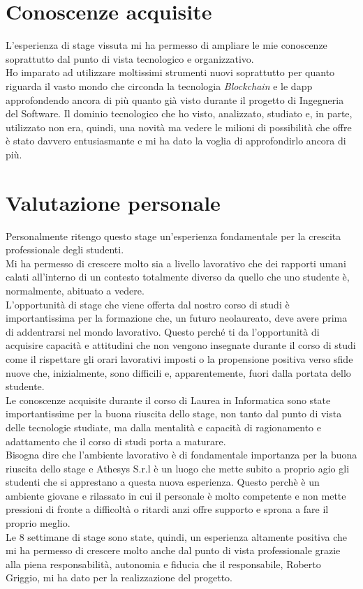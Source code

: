 \section{Conoscenze acquisite}
L'esperienza di stage vissuta mi ha permesso di ampliare le mie conoscenze soprattutto dal punto di vista tecnologico e organizzativo.\\
Ho imparato ad utilizzare moltissimi strumenti nuovi soprattutto per quanto riguarda il vasto mondo che circonda la tecnologia \textit{Blockchain} e le \gls{dapp} approfondendo ancora di più quanto già visto durante il progetto di Ingegneria del Software. Il dominio tecnologico che ho visto, analizzato, studiato e, in parte, utilizzato non era, quindi, una novità ma vedere le milioni di possibilità che offre è stato davvero entusiasmante e mi ha dato la voglia di approfondirlo ancora di più.
\section{Valutazione personale}
Personalmente ritengo questo stage un'esperienza fondamentale per la crescita professionale degli studenti.\\
Mi ha permesso di crescere molto sia a livello lavorativo che dei rapporti umani calati all'interno di un contesto totalmente diverso da quello che uno studente è, normalmente, abituato a vedere.\\
L'opportunità di stage che viene offerta dal nostro corso di studi è importantissima per la formazione che, un futuro neolaureato, deve avere prima di addentrarsi nel mondo lavorativo. Questo perché ti da l'opportunità di acquisire capacità e attitudini che non vengono insegnate durante il corso di studi come il rispettare gli orari lavorativi imposti o la propensione positiva verso sfide nuove che, inizialmente, sono difficili e, apparentemente, fuori dalla portata dello studente.\\
Le conoscenze acquisite durante il corso di Laurea in Informatica sono state importantissime per la buona riuscita dello stage, non tanto dal punto di vista delle tecnologie studiate, ma dalla mentalità e capacità di ragionamento e adattamento che il corso di studi porta a maturare.\\
Bisogna dire che l'ambiente lavorativo è di fondamentale importanza per la buona riuscita dello stage e Athesys S.r.l è un luogo che mette subito a proprio agio gli studenti che si apprestano a questa nuova esperienza. Questo perchè è un ambiente giovane e rilassato in cui il personale è molto competente e non mette pressioni di fronte a difficoltà o ritardi anzi offre supporto e sprona a fare il proprio meglio.\\
Le 8 settimane di stage sono state, quindi, un esperienza altamente positiva che mi ha permesso di crescere molto anche dal punto di vista professionale grazie alla piena responsabilità, autonomia e fiducia che il responsabile, Roberto Griggio, mi ha dato per la realizzazione del progetto.